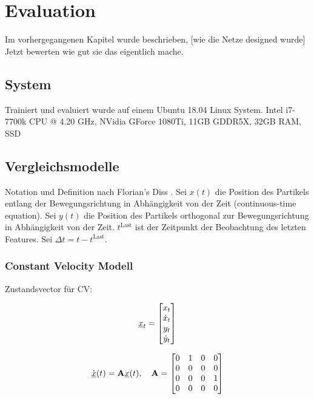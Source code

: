 \chapter{Evaluation}

Im vorhergegangenen Kapitel wurde beschrieben, [wie die Netze designed wurde]
Jetzt bewerten wie gut sie das eigentlich mache.

\section{System}

Trainiert und evaluiert wurde auf einem Ubuntu 18.04 Linux System.
Intel i7-7700k CPU @ 4.20 GHz,
NVidia GForce 1080Ti, 11GB GDDR5X,
32GB RAM,
SSD 


\section{Vergleichsmodelle}

Notation und Definition nach Florian's Diss \cite{Pfaff2018}.
Sei \(x(t)\) die Position des Partikels entlang der Bewegungsrichtung in Abhängigkeit von der Zeit
(continuous-time equation).
Sei \( y(t)\) die Position des Partikels orthogonal zur Bewegungsrichtung in Abhängigkeit von der Zeit.
\(t^{\text{Last}}\) ist der Zeitpunkt der Beobachtung des letzten Features.
Sei \(\Delta t =  t - t^{\text{Last}}\).


\subsection{Constant Velocity Modell}

Zustandsvector für CV:

 \begin{equation*} \label{eq:definitionCV}
    {\underline{x}}_t = 
    \begin{bmatrix}
        x_t \\
        \dot{x}_t \\
        y_t \\
        \dot{y}_t
       \end{bmatrix} 
\end{equation*}

\begin{equation*} \label{eq:speedCV}
    \dot{{\underline{x}}}(t) = {{\mathbf{A}}}{\underline{x}}(t), \quad {\ensuremath{{\mathbf{A}}}} = 
    \begin{bmatrix}
        0 & 1 & 0 & 0 \\
        0 & 0 & 0 & 0 \\
        0 & 0 & 0 & 1\\
        0 & 0 & 0 & 0
    \end{bmatrix} 
\end{equation*}

